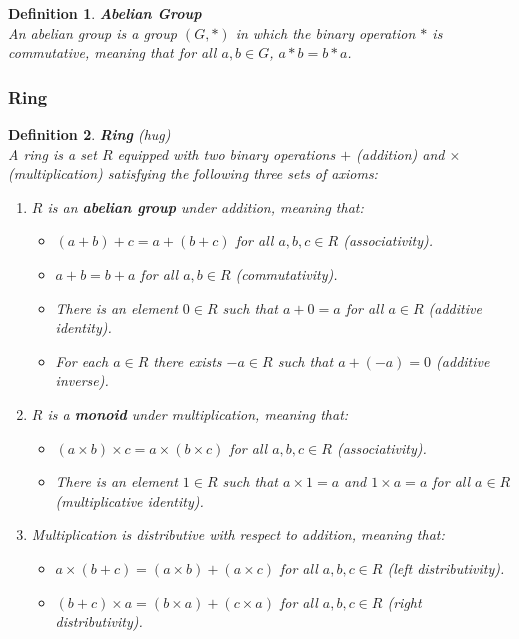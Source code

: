 \documentclass[11pt]{book} %
\newtheorem{definition}{Definition}[section]
\begin{document}
\begin{definition}{\textbf{Abelian Group}} \\
    An abelian group is a group \( (G, *) \) in which the binary operation \( * \) is commutative, 
    meaning that for all \(a, b \in G\), \(a * b = b * a\).
\end{definition}

\subsubsection{Ring}

\begin{definition}{\textbf{Ring} (hug)} \\
    A ring is a set \(R\) equipped with two binary operations \(+\) (addition) and \(\times\) (multiplication) satisfying the following three sets of axioms:
    \begin{enumerate}
        \item \(R\) is an \textbf{abelian group} under addition, meaning that:
        \begin{itemize}
            \item \((a + b) + c = a + (b + c)\) for all \(a, b, c \in R\) (associativity).
            \item \(a + b = b + a\) for all \(a, b \in R\) (commutativity).
            \item There is an element \(0 \in R\) such that \(a + 0 = a\) for all \(a \in R\) (additive identity).
            \item For each \(a \in R\) there exists \(-a \in R\) such that \(a + (-a) = 0\) (additive inverse).
        \end{itemize}
        \item \(R\) is a \textbf{monoid} under multiplication, meaning that:
        \begin{itemize}
            \item \((a \times b) \times c = a \times (b \times c)\) for all \(a, b, c \in R\) (associativity).
            \item There is an element \(1 \in R\) such that \(a \times 1 = a\) and \(1 \times a = a\) for all \(a \in R\) (multiplicative identity).
        \end{itemize}
        \item Multiplication is distributive with respect to addition, meaning that:
        \begin{itemize}
            \item \(a \times (b + c) = (a \times b) + (a \times c)\) for all \(a, b, c \in R\) (left distributivity).
            \item \((b + c) \times a = (b \times a) + (c \times a)\) for all \(a, b, c \in R\) (right distributivity).
        \end{itemize}
    \end{enumerate}
\end{definition}
\end{document}
